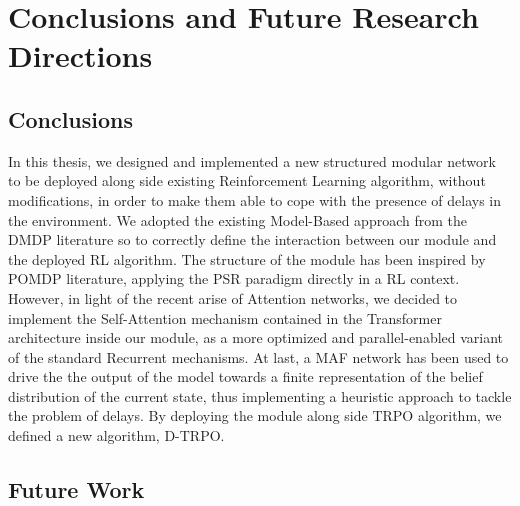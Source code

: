 \chapter{Conclusions and Future Research Directions}
    \section{Conclusions}
    \label{conc:conc}
        
        In this thesis, we designed and implemented a new structured modular network to be deployed along side existing Reinforcement Learning algorithm, without modifications, in order to make them able to cope with the presence of delays in the environment. We adopted the existing Model-Based approach from the DMDP literature so to correctly define the interaction between our module and the deployed RL algorithm. The structure of the module has been inspired by POMDP literature, applying the PSR paradigm directly in a RL context. However, in light of the recent arise of Attention networks, we decided to implement the Self-Attention mechanism contained in the Transformer architecture inside our module, as a more optimized and parallel-enabled variant of the standard Recurrent mechanisms. At last, a MAF network has been used to drive the the output of the model towards a finite representation of the belief distribution of the current state, thus implementing a heuristic approach to tackle the problem of delays. By deploying the module along side TRPO algorithm, we defined a new algorithm, D-TRPO. \newline
        
        
    \section{Future Work}
    \label{conc:future}
